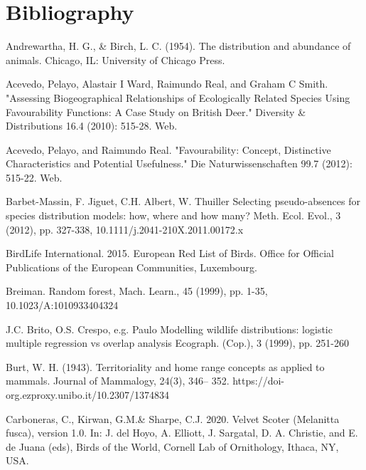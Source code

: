 \documentclass[12pt,a4paper]{article}
\begin{document}
\newpage
\section{Bibliography}
\begin{thebibliography}{999}

Andrewartha, H. G., \& Birch, L. C. (1954). The distribution and abundance of animals. Chicago, IL: University of Chicago Press.

Acevedo, Pelayo, Alastair I Ward, Raimundo Real, and Graham C Smith. "Assessing Biogeographical Relationships of Ecologically Related Species Using Favourability Functions: A Case Study on British Deer." Diversity & Distributions 16.4 (2010): 515-28. Web.

Acevedo, Pelayo, and Raimundo Real. "Favourability: Concept, Distinctive Characteristics and Potential Usefulness." Die Naturwissenschaften 99.7 (2012): 515-22. Web.

Barbet-Massin, F. Jiguet, C.H. Albert, W. Thuiller
Selecting pseudo-absences for species distribution models: how, where and how many?
Meth. Ecol. Evol., 3 (2012), pp. 327-338, 10.1111/j.2041-210X.2011.00172.x

BirdLife International. 2015. European Red List of Birds. Office for Official Publications of the European Communities, Luxembourg.

Breiman. Random forest, Mach. Learn., 45 (1999), pp. 1-35, 10.1023/A:1010933404324

J.C. Brito, O.S. Crespo, e.g. Paulo
Modelling wildlife distributions: logistic multiple regression vs overlap analysis
Ecograph. (Cop.), 3 (1999), pp. 251-260

Burt, W. H. (1943). Territoriality and home range concepts as applied to mammals. Journal of Mammalogy, 24(3), 346– 352. https://doi-org.ezproxy.unibo.it/10.2307/1374834


Carboneras, C., Kirwan, G.M.\& Sharpe, C.J. 2020. Velvet Scoter (Melanitta fusca), version 1.0. In: J. del Hoyo, A. Elliott, J. Sargatal, D. A. Christie, and E. de Juana (eds), Birds of the World, Cornell Lab of Ornithology, Ithaca, NY, USA.


\end{thebibliography}
\end{document}
